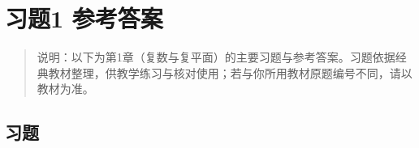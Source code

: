 \chapter{习题1 参考答案}\label{ux4e60ux98981-ux53c2ux8003ux7b54ux6848}

\begin{quote}
说明：以下为第1章（复数与复平面）的主要习题与参考答案。习题依据经典教材整理，供教学练习与核对使用；若与你所用教材原题编号不同，请以教材为准。
\end{quote}

\section{习题}\label{ux4e60ux9898}

